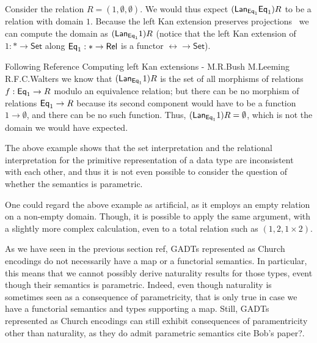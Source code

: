 \documentclass[acmsmall,screen,review,anonymous]{acmart}
\theoremstyle{definition}
\newcommand{\set}{\mathsf{Set}}
\begin{document}
Consider the relation $R = (1, \emptyset, \emptyset)$.  We would thus
expect $(\mathsf{\mathsf{Lan}}_{\mathsf{Eq}_1} \mathsf{Eq}_1) R$ to be a relation with domain
$1$.  Because the left Kan extension preserves
projections~\cite{rie16} we can compute the domain as
$(\mathsf{\mathsf{Lan}}_{\mathsf{Eq}_1} 1) R$ (notice that the left Kan extension of
$1 : \ast \to \set$ along $\mathsf{Eq}_1 : \ast \to \mathsf{Rel}$ is a functor $\rel
\to \set$).

Following {\color{blue} Reference Computing left Kan extensions -
  M.R.Bush M.Leeming R.F.C.Walters} we know that
$(\mathsf{\mathsf{Lan}}_{\mathsf{Eq}_1} 1) R$ is the set of all morphisms of relations
$f : \mathsf{Eq}_1 \to R$ modulo an equivalence relation; but there can be no
morphism of relations $\mathsf{Eq}_1 \to R$ because its second component would
have to be a function $1 \to \emptyset$, and there can be no such
function.  Thus, $(\mathsf{\mathsf{Lan}}_{\mathsf{Eq}_1} 1) R = \emptyset$, which is
not the domain we would have expected.

The above example shows that the set interpretation and the relational
interpretation for the primitive representation of a data type are
inconsistent with each other, and thus it is not even possible to
consider the question of whether the semantics is parametric.

One could regard the above example as artificial, as it employs an
empty relation on a non-empty domain.  Though, it is possible to apply
the same argument, with a slightly more complex calculation, even to a
total relation such as $(1, 2, 1 \times 2)$.


\vspace*{0.2in}


As we have seen in the previous section {\color{blue} ref}, GADTs
represented as Church encodings do not necessarily have a map or a
functorial semantics.  In particular, this means that we cannot
possibly derive naturality results for those types, event though their
semantics is parametric.  Indeed, even though naturality is sometimes
seen as a consequence of parametricity, that is only true in case we
have a functorial semantics and types supporting a map.  Still, GADTs
represented as Church encodings can still exhibit consequences of
paramentricity other than naturality, as they do admit parametric
semantics {\color{blue} cite Bob's paper?}.
\end{document}
